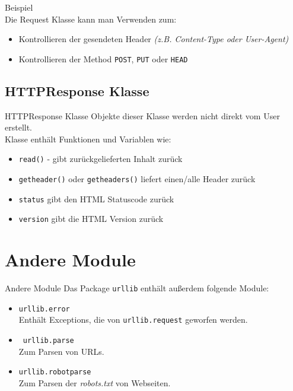 \begin{frame}{Beispiel}
	 \ \\[.5cm]
	Die Request Klasse kann man Verwenden zum:
	\begin{itemize}
		\item Kontrollieren der gesendeten Header \textit{(z.B. Content-Type oder User-Agent)}
		\item Kontrollieren der Method \texttt{POST}, \texttt{PUT} oder \texttt{HEAD}
	\end{itemize}
\end{frame}

\subsection{HTTPResponse Klasse}
\begin{frame}[fragile]{HTTPResponse Klasse}
	Objekte dieser Klasse werden nicht direkt vom User erstellt.
	 \ \\[.5cm]
	Klasse enth\"alt Funktionen und Variablen wie:
	\begin{itemize}
		\item \texttt{read()} - gibt zur\"uckgelieferten Inhalt zur\"uck
		\item \texttt{getheader()} oder \texttt{getheaders()} liefert einen/alle Header zur\"uck
		\item \texttt{status} gibt den HTML Statuscode zur\"uck
		\item \texttt{version} gibt die HTML Version zur\"uck
	\end{itemize}
\end{frame}


\section{Andere Module}
\begin{frame}[fragile]{Andere Module}
	Das Package \texttt{urllib} enth\"alt au{\ss}erdem folgende Module:
	\begin{itemize}
		\item \texttt{urllib.error} \\
			Enth\"alt Exceptions, die von \texttt{urllib.request} geworfen werden.
		\item \texttt{urllib.parse} \\
			Zum Parsen von URLs.
		\item \texttt{urllib.robotparse} \\
			Zum Parsen der \textit{robots.txt} von Webseiten.
	\end{itemize}
\end{frame}


